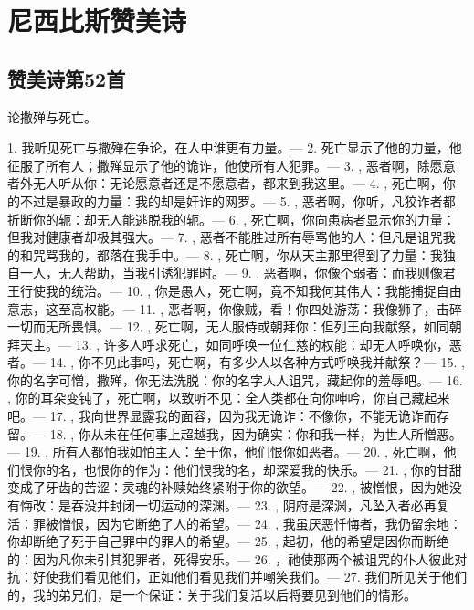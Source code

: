 
\section{尼西比斯赞美诗}


\subsection{赞美诗第52首}

论撒殚与死亡。\par

1. 我听见死亡与撒殚在争论，在人中谁更有力量。— 2. 死亡显示了他的力量，他征服了所有人；撒殚显示了他的诡诈，他使所有人犯罪。— 3. , 恶者啊，除愿意者外无人听从你：无论愿意者还是不愿意者，都来到我这里。— 4. , 死亡啊，你的不过是暴政的力量：我的却是奸诈的网罗。— 5. , 恶者啊，你听，凡狡诈者都折断你的轭：却无人能逃脱我的轭。— 6. , 死亡啊，你向患病者显示你的力量：但我对健康者却极其强大。— 7. , 恶者不能胜过所有辱骂他的人：但凡是诅咒我的和咒骂我的，都落在我手中。— 8. , 死亡啊，你从天主那里得到了力量：我独自一人，无人帮助，当我引诱犯罪时。— 9. , 恶者啊，你像个弱者：而我则像君王行使我的统治。— 10. , 你是愚人，死亡啊，竟不知我何其伟大：我能捕捉自由意志，这至高权能。— 11. , 恶者啊，你像贼，看！你四处游荡：我像狮子，击碎一切而无所畏惧。— 12. , 死亡啊，无人服侍或朝拜你：但列王向我献祭，如同朝拜天主。— 13. , 许多人呼求死亡，如同呼唤一位仁慈的权能：却无人呼唤你，恶者。— 14. , 你不见此事吗，死亡啊，有多少人以各种方式呼唤我并献祭？— 15. , 你的名字可憎，撒殚，你无法洗脱：你的名字人人诅咒，藏起你的羞辱吧。— 16. , 你的耳朵变钝了，死亡啊，以致听不见：全人类都在向你呻吟，你自己藏起来吧。— 17. , 我向世界显露我的面容，因为我无诡诈：不像你，不能无诡诈而存留。— 18. , 你从未在任何事上超越我，因为确实：你和我一样，为世人所憎恶。— 19. , 所有人都怕我如怕主人：至于你，他们恨你如恶者。— 20. , 死亡啊，他们恨你的名，也恨你的作为：他们恨我的名，却深爱我的快乐。— 21. , 你的甘甜变成了牙齿的苦涩：灵魂的补赎始终紧附于你的欲望。— 22. , 被憎恨，因为她没有悔改：是吞没并封闭一切运动的深渊。— 23. , 阴府是深渊，凡坠入者必再复活：罪被憎恨，因为它断绝了人的希望。— 24. , 我虽厌恶忏悔者，我仍留余地：你却断绝了死于自己罪中的罪人的希望。— 25. , 起初，他的希望是因你而断绝的：因为凡你未引其犯罪者，死得安乐。— 26. ，祂使那两个被诅咒的仆人彼此对抗：好使我们看见他们，正如他们看见我们并嘲笑我们。— 27. 我们所见关于他们的，我的弟兄们，是一个保证：关于我们复活以后将要见到他们的情形。\par

